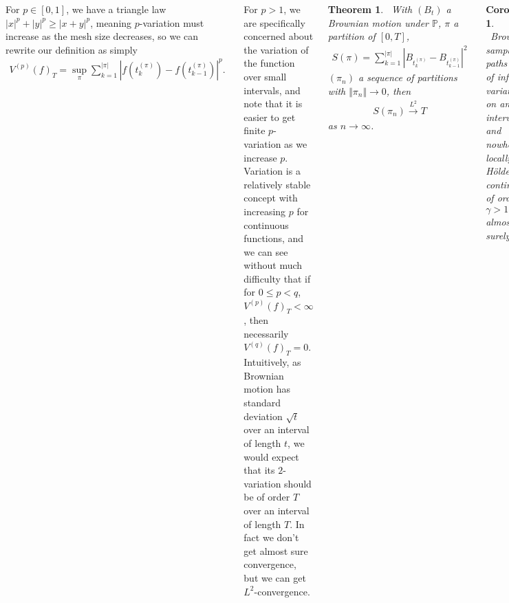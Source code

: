 \documentclass{tikzposter} %
\newtheorem{theorem}{Theorem}
\newtheorem{corollary}{Corollary}
\begin{document}
\begin{columns}
{    For $p \in [0,1]$, we have a triangle law $|x|^{p}+|y|^{p} \ge |x+y|^{p}$, meaning $p$-variation must increase as the mesh size decreases, so we can rewrite our definition as simply
    \begin{align*}
      V^{(p)}(f)_{T} = \sup_{\pi} \sum_{k=1}^{|\pi|} |f(t_{k}^{(\pi)}) - f(t_{k-1}^{(\pi)})|^{p}.
    \end{align*}

    For $p > 1$, we are specifically concerned about the variation of the function over small intervals, and note that it is easier to get finite $p$-variation as we increase $p$. Variation is a relatively stable concept with increasing $p$ for continuous functions, and we can see without much difficulty that if for $0 \le p < q$, $V^{(p)}(f)_{T} < \infty$, then necessarily $V^{(q)}(f)_{T} = 0$. \\

    Intuitively, as Brownian motion has standard deviation $\sqrt{t}$ over an interval of length $t$, we would expect that its $2$-variation should be of order $T$ over an interval of length $T$. In fact we don't get almost sure convergence, but we can get $L^{2}$-convergence. \\

    \begin{theorem}
      \ With $(B_{t})$ a Brownian motion under $\mathbb{P}$, $\pi$ a partition of $[0,T]$,
      \begin{align*}
        S(\pi) = \sum_{k=1}^{|\pi|} |B_{t^{(\pi)}_{k}} - B_{t^{(\pi)}_{k-1}}|^{2}
      \end{align*}
      $(\pi_{n})$ a sequence of partitions with $\Vert \pi_{n} \Vert \to 0$, then
      \begin{align*}
        S(\pi_{n}) \overset{L^{2}}{\to} T
      \end{align*}
      as $n \to \infty$.
    \end{theorem}
    \hphantom{}

    \begin{corollary}
    \ Brownian sample paths are of infinite variation on any interval, and nowhere locally H\"{o}lder continuous of order $\gamma > 1/2$ almost surely.
    \end{corollary}
    \hphantom{}

    Note here that there is a subsequence $(\pi_{n_{k}})$ such that $S(\pi_{n_{k}}) \to T$ almost surely. $S(\pi_{n_{k}}) \to T \le \varepsilon V(B_{t})_{T}$ for all $\varepsilon > 0$ by the continuity of $(B_{t})$, so thus $V(B_{t})_{T} = \infty$ almost surely. Nowhere locally H\"older continuous comes about by contradiction with a similar argument. \\

}
\end{columns}
\end{document}
